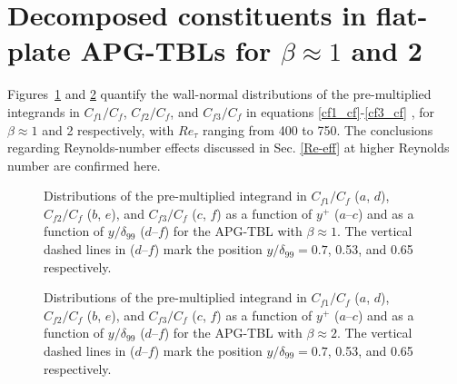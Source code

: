 \renewcommand\thefigure{\Alph{section}\arabic{figure}}    
\setcounter{figure}{0}   


\appendix


\section{Decomposed constituents in flat-plate APG-TBLs for $\beta\approx1$ and 2}\label{app1}

Figures~\ref{app:fig1} and \ref{app:fig2} quantify the wall-normal distributions of the pre-multiplied integrands in $C_{f1}/C_f$, $C_{f2}/C_f$, and $C_{f3}/C_f$ in equations \eqref{cf1_cf}-\eqref{cf3_cf} , for $\beta\approx1$ and 2 respectively, with $Re_\tau$ ranging from 400 to 750.
The conclusions regarding Reynolds-number effects discussed in Sec. \ref{Re-eff} at higher Reynolds number are confirmed here.

\begin{figure}[htb]
\subfigure{\texttt{[image: 13a]} }
\subfigure{\texttt{[image: 13b]} }
\subfigure{\texttt{[image: 13c]} }
\subfigure{\texttt{[image: 13d]} }
\subfigure{\texttt{[image: 13e]} }
\subfigure{\texttt{[image: 13f]} }
\caption{Distributions of the pre-multiplied integrand in $C_{f1}/C_f$ ($a$, $d$), $C_{f2}/C_f$ ($b$, $e$), and $C_{f3}/C_f$ ($c$, $f$) as a function of $y^+$ ($a$--$c$) and as a function of  $y/\delta_{99}$  ($d$--$f$)  for the APG-TBL with $\beta\approx1$. The vertical dashed lines in ($d$--$f$) mark the position $y/\delta_{99}=0.7$, 0.53, and 0.65 respectively.}
\label{app:fig1}
\end{figure}

\begin{figure}[htb]
\subfigure{\texttt{[image: 14a]} }
\subfigure{\texttt{[image: 14b]} }
\subfigure{\texttt{[image: 14c]} }
\subfigure{\texttt{[image: 14d]} }
\subfigure{\texttt{[image: 14e]} }
\subfigure{\texttt{[image: 14f]} }
\caption{Distributions of the pre-multiplied integrand in $C_{f1}/C_f$ ($a$, $d$), $C_{f2}/C_f$ ($b$, $e$), and $C_{f3}/C_f$ ($c$, $f$) as a function of $y^+$ ($a$--$c$) and as a function of  $y/\delta_{99}$  ($d$--$f$)  for the APG-TBL with $\beta\approx2$. The vertical dashed lines in ($d$--$f$) mark the position $y/\delta_{99}=0.7$, 0.53, and 0.65 respectively.}
\label{app:fig2}
\end{figure}


